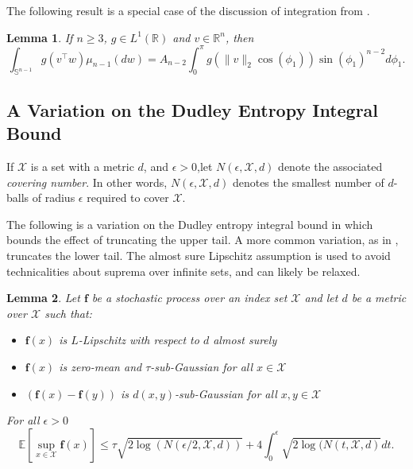 \documentclass[twoside]{article}
\newtheorem{lemma}{Lemma}
\theoremstyle{definition}
\newcommand{\R}{\mathbb{R}}
\newcommand{\E}{\mathbb{E}}
\renewcommand{\S}{\mathbb{S}}
\newcommand{\cX}{\mathcal{X}}
\newcommand{\1}[1]{\scalebox{1.25}{$\mathds{1}$}\left[#1\right]}
\begin{document}
The following result is a special case of the discussion of integration from \cite{blumenson1960derivation}. 
\begin{lemma}
\label{eq:1dIntegral}
If $n\ge 3$,  $g\in L^1(\R)$ and $v\in \R^n$, then
$$
\int_{\S^{n-1}}g(v^\top w)\mu_{n-1}(dw)=A_{n-2}\int_0^\pi g(\|v\|_2 \cos(\phi_1))\sin(\phi_1)^{n-2}d\phi_1.
$$
\end{lemma}

\subsection{A Variation on the Dudley Entropy Integral Bound}

If $\cX$ is a set with a metric $d$, and $\epsilon >0$,let $N(\epsilon,\cX,d)$ denote the associated \emph{covering number}. In other words, $N(\epsilon,\cX,d)$ denotes the smallest number of $d$-balls of radius $\epsilon$ required to cover $\cX$.

The following is a variation on the Dudley entropy integral bound in which bounds the effect of truncating the upper tail. A more common variation, as in \cite{wainwright2019high}, truncates the lower tail. The almost sure Lipschitz assumption is used to avoid technicalities about suprema over infinite sets,  and can likely be relaxed.


\begin{lemma}
\label{lem:dudley}
Let $\bm{f}$ be a stochastic process over an index set $\cX$ and let $d$ be a metric over $\cX$ such that:
\begin{itemize}
\item $\bm{f}(x)$ is $L$-Lipschitz with respect to $d$ almost surely
\item $\bm{f}(x)$ is zero-mean and $\tau$-sub-Gaussian for all $x\in\cX$
\item $(\bm{f}(x)-\bm{f}(y))$ is  $d(x,y)$-sub-Gaussian for all $x,y\in\cX$
\end{itemize}
For all $\epsilon >0$
$$
\E\left[\sup_{x\in\cX} \bm{f}(x)\right]\le \tau\sqrt{2\log(N(\epsilon/2,\cX,d))}+
4\int_{0}^{\epsilon} \sqrt{2\log(N(t,\cX,d)}dt.
$$
\end{lemma}
\end{document}
